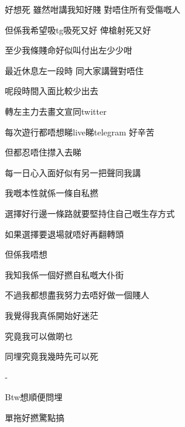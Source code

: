 好想死 雖然咁講我知好賤 對唔住所有受傷嘅人

但係我希望吸tg吸死又好 俾槍射死又好

至少我條賤命好似叫付出左少少咁

最近休息左一段時 同大家講聲對唔住

呢段時間入面比較少出去

轉左主力去畫文宣同twitter

每次遊行都唔想睇live睇telegram 好辛苦

但都忍唔住㩒入去睇

每一日心入面好似有另一把聲同我講

我嘅本性就係一條自私撚

選擇好行邊一條路就要堅持住自己嘅生存方式

如果選擇要退場就唔好再翻轉頭

但係我唔想

我知我係一個好撚自私嘅大仆街

不過我都想盡我努力去唔好做一個賤人

我覺得我真係開始好迷茫

究竟我可以做啲乜

同埋究竟我幾時先可以死

-

Btw想順便問埋

單拖好撚驚點搞

